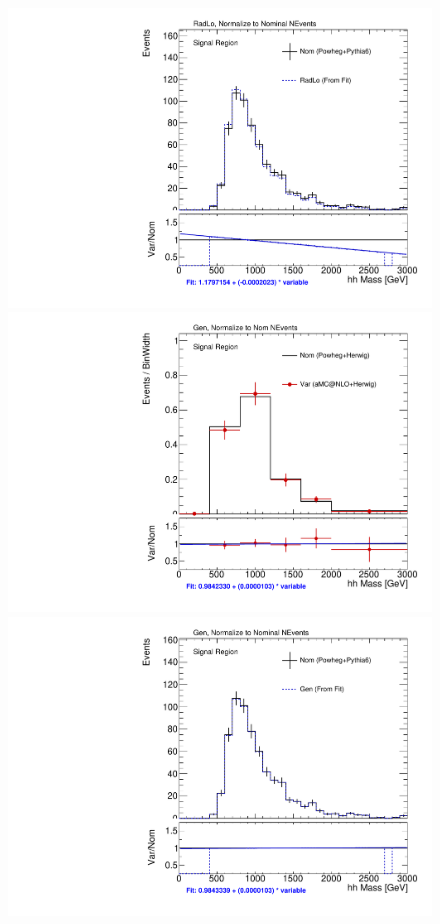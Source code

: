 \begin{figure}[!htbp]
\begin{center}
\includegraphics[scale=0.25]{./figures/boosted/systematics/ttbar_fromfit_hhMass_SR_RadLo}  \\
\includegraphics[scale=0.25]{./figures/boosted/systematics/ttbar_alt_hhMass_SR_Gen_rebin}  
\includegraphics[scale=0.25]{./figures/boosted/systematics/ttbar_fromfit_hhMass_SR_Gen}     \\

\end{center}
\end{figure}

